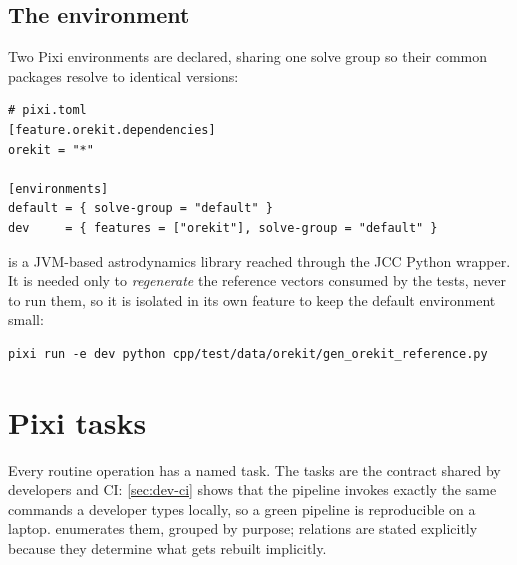 \subsection{The  environment}
\label{sec:dev-envs}

Two Pixi environments are declared, sharing one solve group so their common
packages resolve to identical versions:

\begin{lstlisting}[language=yamlcfg]
# pixi.toml
[feature.orekit.dependencies]
orekit = "*"

[environments]
default = { solve-group = "default" }
dev     = { features = ["orekit"], solve-group = "default" }
\end{lstlisting}

 is a JVM-based astrodynamics library reached through the JCC
Python wrapper. It is needed only to \emph{regenerate} the reference vectors
consumed by the  tests, never to run them, so it is
isolated in its own feature to keep the default environment small:

\begin{lstlisting}[language=shell]
pixi run -e dev python cpp/test/data/orekit/gen_orekit_reference.py
\end{lstlisting}

\section{Pixi tasks}
\label{sec:dev-tasks}

Every routine operation has a named task. The tasks are the contract shared by
developers and CI: \cref{sec:dev-ci} shows that the pipeline invokes exactly
the same  commands a developer types locally, so a green
pipeline is reproducible on a laptop.  enumerates them,
grouped by purpose;  relations are stated explicitly because
they determine what gets rebuilt implicitly.

